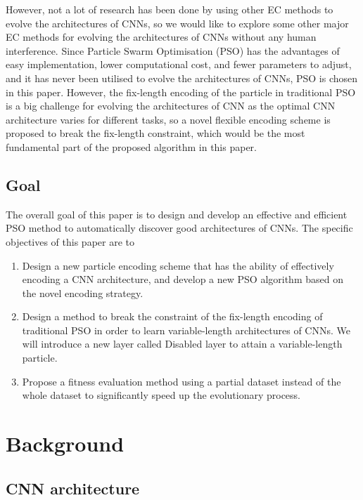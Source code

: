 \documentclass[conference]{IEEEtran}
\begin{document}
However, not a lot of research has been done by using other EC methods to evolve the architectures of CNNs, so we would like to explore some other major EC methods for evolving the architectures of CNNs without any human interference. Since Particle Swarm Optimisation (PSO) has the advantages of easy implementation, lower computational cost, and fewer parameters to adjust, and it has never been utilised to evolve the architectures of CNNs, PSO is chosen in this paper. However, the fix-length encoding of the particle in traditional PSO is a big challenge for evolving the architectures of CNN as the optimal CNN architecture varies for different tasks, so a novel flexible encoding scheme is proposed to break the fix-length constraint, which would be the most fundamental part of the proposed algorithm in this paper.


\subsection{Goal}
The overall goal of this paper is to design and develop an effective and efficient PSO method to automatically discover good architectures of CNNs. The specific objectives of this paper are to

\begin{enumerate}
	\item Design a new particle encoding scheme that has the ability of effectively encoding a CNN architecture, and develop a new PSO algorithm based on the novel encoding strategy.
	\item Design a method to break the constraint of the fix-length encoding of traditional PSO in order to learn variable-length architectures of CNNs. We will introduce a new layer called Disabled layer to attain a variable-length particle.
	\item Propose a fitness evaluation method using a partial dataset instead of the whole dataset to significantly speed up the evolutionary process.
\end{enumerate}



\section{Background}\label{sec:Background}

\subsection{CNN architecture}\label{sec:CNNArchitecture}
\end{document}
